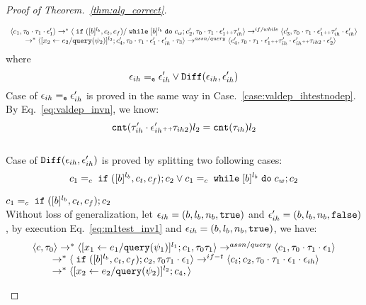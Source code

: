 \begin{proof}[Proof of Theorem.~\ref{thm:alg_correct}]
\begin{case}
\begin{subcase}
\begin{subsubcase}
\begin{subsubsubcase}
\begin{equation}
\label{eq:m1test_inv2}
  \begin{array}{l}   
  \langle c_1, \mathtt{\tau}_0 \cdot \mathtt{\tau}_1 \cdot \mathtt{\epsilon}_1' \rangle 
  \rightarrow^{*} 
  \langle \;\mathtt{if}\; ([b]^{l_b}, c_t, c_f) / \;\mathtt{while}\; [b]^{l_b} \;\mathtt{do}\; c_w ; {c}_2', \mathtt{\tau}_0 \cdot \mathtt{\tau}_1 \cdot \mathtt{\epsilon}_1' {\scriptscriptstyle ++} \mathtt{\tau}_{ih}' \rangle 
  \rightarrow^{if / while} 
  \langle c_3', \mathtt{\tau}_0 \cdot \mathtt{\tau}_1 \cdot \mathtt{\epsilon}_1'  {\scriptscriptstyle ++} \mathtt{\tau}_{ih}' \cdot \mathtt{\epsilon}_{ih}' \rangle 
  \\
  \qquad \rightarrow^{*} 
  \langle [\mathrel{ {x}_2 \leftarrow e_2 / {\tt query}(\psi_2) }]^{l_2};{c}_4', 
  \mathtt{\tau}_0 \cdot \mathtt{\tau}_1 \cdot \mathtt{\epsilon}_1' \cdot \mathtt{\epsilon}_{ih}' \cdot \mathtt{\tau}_3 \rangle
  \rightarrow^{assn/query} 
  \langle {c}_4',  \mathtt{\tau}_0 \cdot \mathtt{\tau}_1 \cdot \mathtt{\epsilon}_1' {\scriptscriptstyle ++} \mathtt{\tau}_{ih}' \cdot \mathtt{\epsilon}_{ih}' {\scriptscriptstyle ++} \mathtt{\tau}_{ih2} \cdot \mathtt{\epsilon}_2' \rangle 
\end{array}
\end{equation}
where 
\[
  \mathtt{\epsilon}_{ih} =_{\mathtt{e}} \mathtt{\epsilon}_{ih}' \lor \mathtt{Diff}(\mathtt{\epsilon}_{ih}, \mathtt{\epsilon}_{ih}')
\]
%
Case of $\mathtt{\epsilon}_{ih} =_{\mathtt{e}} \mathtt{\epsilon}_{ih}'$ is proved in the same way in Case.~\ref{case:valdep_ihtestnodep}.
%
By Eq.~\ref{eq:valdep_invn}, we know:
%
\[
\mathtt{cnt}(\mathtt{\tau}_{ih}' \cdot \mathtt{\epsilon}_{ih}' {\scriptscriptstyle ++} \mathtt{\tau}_{ih2}) l_2  = \mathtt{cnt}(\mathtt{\tau}_{ih}) l_2 
 \]
%
\\
Case of $\mathtt{Diff}(\mathtt{\epsilon}_{ih}, \mathtt{\epsilon}_{ih}')$ is proved by splitting two following cases:
\[
  c_1 =_c \;\mathtt{if}\; ([b]^{l_b}, c_t, c_f);{c}_2
  \lor
  c_1 =_c \;\mathtt{while}\; [b]^{l_b} \;\mathtt{do}\; c_w;{c}_2
\]
\begin{subproof} 
%
$c_1 =_c \;\mathtt{if}\; ([b]^{l_b}, c_t, c_f);{c}_2$ 
\\
Without loss of generalization, 
let $\mathtt{\epsilon}_{ih} = (b, l_b, n_b, \mathtt{true})$ and
$\mathtt{\epsilon}_{ih}' = (b, l_b, n_b, \mathtt{false})$,
by execution Eq.~\ref{eq:m1test_inv1} and $\mathtt{\epsilon}_{ih} = (b, l_b, n_b, \mathtt{true})$, we have:
\[
  \begin{array}{l}   
  \langle {c}, \mathtt{\tau}_0 \rangle \rightarrow^{*} 
  \langle [\mathrel{ {x}_1 \leftarrow e_1 / {\tt query}(\psi_1) }]^{l_1} ; {c}_1, \mathtt{\tau}_0 \mathtt{\tau}_1 \rangle  
  \rightarrow^{assn/query}
  \langle c_1, \mathtt{\tau}_0 \cdot \mathtt{\tau}_1 \cdot \mathtt{\epsilon}_1 \rangle 
  \\
  \qquad \rightarrow^{*} 
  \langle \;\mathtt{if}\; ([b]^{l_b}, c_t, c_f);{c}_2, \mathtt{\tau}_0 \mathtt{\tau}_1 \cdot \mathtt{\epsilon}_1 \rangle 
  \rightarrow^{if-t} 
  \langle c_t;c_2, \mathtt{\tau}_0 \cdot \mathtt{\tau}_1 \cdot \mathtt{\epsilon}_1 \cdot \mathtt{\epsilon}_{ih} \rangle 
  \\
  \qquad \rightarrow^{*} 
  \langle [\mathrel{ {x}_2 \leftarrow e_2 / {\tt query}(\psi_2) }]^{l_2};{c}_4, 
 \rangle
\end{array}\]
\end{subproof}
\end{subsubsubcase}
\end{subsubcase}
\end{subcase}
\end{case}
\end{proof}
